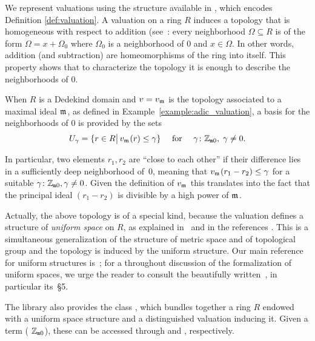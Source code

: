 \documentclass[sigplan,screen]{acmart}
\begin{document}
We represent valuations using the \href{https://leanprover-community.github.io/mathlib_docs/ring_theory/valuation/basic.html#valuation}{\extlink} structure
available in \mathlib, which encodes Definition \ref{def:valuation}. A valuation on a ring $R$ induces a topology that is homogeneous with respect to addition (see~\cite[Chapitre~III,\S1]{Bou71}: every neighborhood $\Omega\subseteq R$ is of the form $\Omega=x+\Omega_0$ where $\Omega_0$ is a neighborhood of $0$ and $x\in\Omega$. In other words, addition (and subtraction) are homeomorphisms of the ring into itself. This property shows that to characterize the topology it is enough to describe the neighborhoods of $0$.
 
 When $R$ is a Dedekind domain and $v=v_{\maxid[\empty]}$ is the topology associated to a maximal ideal $\maxid[\empty]$, as defined in Example~\ref{example:adic_valuation}, 
 a basis for the neighborhoods of $0$ is provided by the sets
 \[
 U_\gamma = \{r \in R \big\vert\,v_{\maxid[\empty]}(r)\leq \gamma\}\quad\text{ for }\quad\gamma \colon \wzmZZ,\; \gamma \ne 0.
 \]

In particular, two elements $r_1,r_2$ are ``close to each other'' %
if their difference lies in a sufficiently deep neighborhood of~$0$, meaning that $v_{\maxid[\empty]}(r_1-r_2)\leq \gamma$ for a suitable $ \gamma \colon \mathbb{Z}_{\mathtt{m}0}, \gamma \ne 0$. Given the definition of $v_{\maxid[\empty]}$ this translates into the fact that the principal ideal $(r_1-r_2)$ is divisible by a high power of $\maxid[\empty]$.

Actually, the above topology is of a special kind, because the valuation defines a structure of \emph{uniform space} on $R$, as explained in~\cite[Chapitre~VI, \S5]{Bou85} and in the references \ibid. This is a simultaneous generalization of the structure of metric space and of topological group and the topology is induced by the uniform structure. Our main reference for uniform structures is~\cite[Chapitre~II]{Bou71}; for a throughout discussion of the formalization of uniform spaces, we urge the reader to consult the  beautifully written~\cite{BuzComMas20}, in particular its~\S5.
 
The \mathlib library also provides the class \href{https://leanprover-community.github.io/mathlib_docs/topology/algebra/valuation.html#valued}{\extlink}, which bundles together a ring $R$ endowed with a uniform space structure and a distinguished valuation inducing it. Given a term  ( $\mathbb{Z}_{\mathtt{m}0}$), these can be accessed through  and , respectively.
\end{document}
